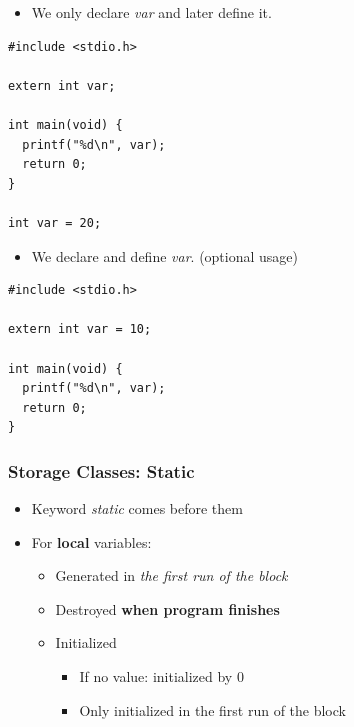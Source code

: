 \documentclass{../c-lecture}
\begin{document}
\begin{frame}[fragile]
  \begin{itemize}
    \item We only declare \textit{\color{YellowOrange} var} and later define it.
  \end{itemize}
  \scriptsize
  \begin{verbatim}
#include <stdio.h>

extern int var;

int main(void) {
  printf("%d\n", var);
  return 0;
}

int var = 20;
  \end{verbatim}
  \begin{itemize}
    \item We declare and define \textit{\color{YellowOrange} var}. (optional usage)
  \end{itemize}
  \scriptsize
  \begin{verbatim}
#include <stdio.h>

extern int var = 10;

int main(void) {
  printf("%d\n", var);
  return 0;
}
  \end{verbatim}
\end{frame}

\begin{frame}
  \frametitle{Storage Classes: Static}
  \begin{itemize}
    \item Keyword \textit{\color{YellowOrange} static} comes before them
    \item For \textbf{\color{Goldenrod} local} variables:
    \begin{itemize}
      \item
        Generated in
        \textit{\color{Purple} the first run of the block}
      \item Destroyed \textbf{\color{Cyan} when program finishes}
      \item Initialized
      \begin{itemize}
        \item If no value: initialized by 0
        \item Only initialized in the first run of the block
      \end{itemize}
    \end{itemize}
  \end{itemize}
\end{frame}
\end{document}
